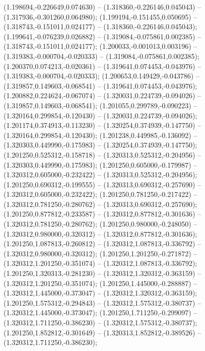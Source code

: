  (1.198694,-0.226649,0.074630) -- (1.318360,-0.226146,0.045043) -- (1.317936,-0.301260,0.064980);
 (1.199194,-0.151455,0.050695) -- (1.318743,-0.151011,0.024177) -- (1.318360,-0.226146,0.045043);
 (1.199641,-0.076239,0.026882) -- (1.319084,-0.075861,0.002385) -- (1.318743,-0.151011,0.024177);
 (1.200033,-0.001013,0.003196) -- (1.319383,-0.000704,-0.020333) -- (1.319084,-0.075861,0.002385);
 (1.200370,0.074213,-0.020361) -- (1.319641,0.074453,-0.043976) -- (1.319383,-0.000704,-0.020333);
 (1.200653,0.149429,-0.043786) -- (1.319857,0.149603,-0.068541) -- (1.319641,0.074453,-0.043976);
 (1.200882,0.224624,-0.067074) -- (1.320031,0.224739,-0.094026) -- (1.319857,0.149603,-0.068541);
 (1.201055,0.299789,-0.090223) -- (1.320164,0.299854,-0.120430) -- (1.320031,0.224739,-0.094026);
 (1.201174,0.374913,-0.113230) -- (1.320254,0.374939,-0.147750) -- (1.320164,0.299854,-0.120430);
 (1.201238,0.449985,-0.136092) -- (1.320303,0.449990,-0.175983) -- (1.320254,0.374939,-0.147750);
 (1.201250,0.525312,-0.158718) -- (1.320313,0.525312,-0.204956) -- (1.320303,0.449990,-0.175983);
 (1.201250,0.605000,-0.179987) -- (1.320312,0.605000,-0.232422) -- (1.320313,0.525312,-0.204956);
 (1.201250,0.690312,-0.199555) -- (1.320313,0.690312,-0.257690) -- (1.320312,0.605000,-0.232422);
 (1.201250,0.781250,-0.217422) -- (1.320312,0.781250,-0.280762) -- (1.320313,0.690312,-0.257690);
 (1.201250,0.877812,-0.233587) -- (1.320312,0.877812,-0.301636) -- (1.320312,0.781250,-0.280762);
 (1.201250,0.980000,-0.248050) -- (1.320312,0.980000,-0.320312) -- (1.320312,0.877812,-0.301636);
 (1.201250,1.087813,-0.260812) -- (1.320312,1.087813,-0.336792) -- (1.320312,0.980000,-0.320312);
 (1.201250,1.201250,-0.271872) -- (1.320312,1.201250,-0.351074) -- (1.320312,1.087813,-0.336792);
 (1.201250,1.320313,-0.281230) -- (1.320312,1.320312,-0.363159) -- (1.320312,1.201250,-0.351074);
 (1.201250,1.445000,-0.288887) -- (1.320312,1.445000,-0.373047) -- (1.320312,1.320312,-0.363159);
 (1.201250,1.575312,-0.294843) -- (1.320312,1.575312,-0.380737) -- (1.320312,1.445000,-0.373047);
 (1.201250,1.711250,-0.299097) -- (1.320312,1.711250,-0.386230) -- (1.320312,1.575312,-0.380737);
 (1.201250,1.852812,-0.301649) -- (1.320313,1.852812,-0.389526) -- (1.320312,1.711250,-0.386230);
